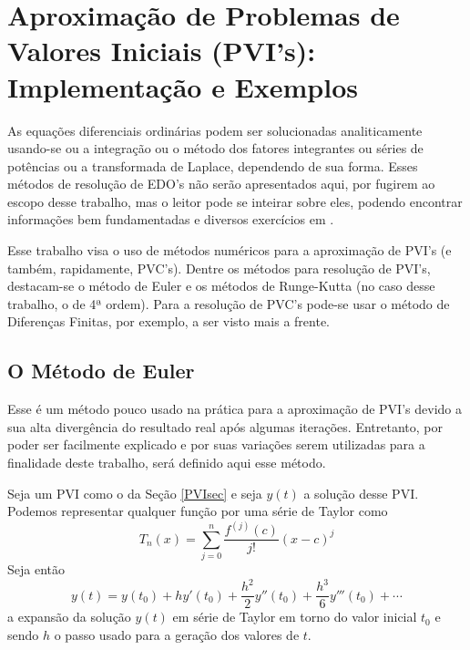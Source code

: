 \chapter{Aproximação de Problemas de Valores Iniciais (PVI's): Implementação e Exemplos}

    \label{cap:aproxPVI}

    As equações diferenciais ordinárias podem ser solucionadas 
    analiticamente usando-se ou a integração ou o método dos fatores integrantes ou séries de potências ou a transformada de Laplace, 
    dependendo de sua forma. Esses métodos de resolução de EDO's não serão apresentados aqui, por fugirem 
    ao escopo desse trabalho, mas o leitor pode se inteirar sobre eles, podendo encontrar 
    informações bem fundamentadas e diversos exercícios em \cite{boyce9, regiIntro}.
    
    Esse trabalho visa o uso de métodos numéricos para a aproximação de PVI's (e também, rapidamente, PVC's). 
    Dentre os métodos para resolução de PVI's, destacam-se o método de Euler e os métodos de Runge-Kutta 
    (no caso desse trabalho, o de 4ª ordem). Para a resolução de PVC's pode-se usar o método de Diferenças
    Finitas, por exemplo, a ser visto mais a frente.
    
    \section{O Método de Euler}
    
        Esse é um método pouco usado na prática para a aproximação de PVI's \cite{burden} devido a sua alta divergência 
        do resultado real após algumas iterações. Entretanto, por poder ser facilmente explicado e por suas variações 
        serem utilizadas para a finalidade deste trabalho, será definido aqui esse método.
        
        Seja um PVI como o da Seção \ref{PVIsec} e seja $y(t)$ a solução desse PVI. Podemos
        representar qualquer função por uma série de Taylor como
		\begin{equation}
		    \label{TayPol}
			T_{n}(x) = \sum_{j=0}^{n} \frac{f^{(j)}(c)}{j!}(x - c)^{j}
		\end{equation}
        Seja então
        \begin{equation}
            \label{TayExpYt}
            y(t) = y(t_0) + hy'(t_0) + \dfrac{h^2}{2}y''(t_0) + \dfrac{h^3}{6}y'''(t_0) + \cdots
        \end{equation}
        a expansão da solução $y(t)$ em série de Taylor em torno do valor inicial $t_0$ e sendo $h$ o passo usado para a geração dos 
        valores de $t$.
        
